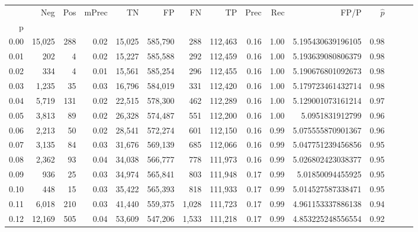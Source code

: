 \begin{tabular}{rrrrrrrrrrrrrrr}
\toprule
{} &     Neg &    Pos & mPrec &       TN &       FP &       FN &       TP &  Prec &   Rec &                  FP/P & $\hat{p}$ \\
p    &         &        &       &          &          &          &          &       &       &                       &           \\
\midrule
0.00 &  15,025 &    288 &  0.02 &   15,025 &  585,790 &      288 &  112,463 &  0.16 &  1.00 &     5.195430639196105 &      0.98 \\
0.01 &     202 &      4 &  0.02 &   15,227 &  585,588 &      292 &  112,459 &  0.16 &  1.00 &     5.193639080806379 &      0.98 \\
0.02 &     334 &      4 &  0.01 &   15,561 &  585,254 &      296 &  112,455 &  0.16 &  1.00 &     5.190676801092673 &      0.98 \\
0.03 &   1,235 &     35 &  0.03 &   16,796 &  584,019 &      331 &  112,420 &  0.16 &  1.00 &     5.179723461432714 &      0.98 \\
0.04 &   5,719 &    131 &  0.02 &   22,515 &  578,300 &      462 &  112,289 &  0.16 &  1.00 &     5.129001073161214 &      0.97 \\
0.05 &   3,813 &     89 &  0.02 &   26,328 &  574,487 &      551 &  112,200 &  0.16 &  1.00 &       5.0951831912799 &      0.96 \\
0.06 &   2,213 &     50 &  0.02 &   28,541 &  572,274 &      601 &  112,150 &  0.16 &  0.99 &     5.075555870901367 &      0.96 \\
0.07 &   3,135 &     84 &  0.03 &   31,676 &  569,139 &      685 &  112,066 &  0.16 &  0.99 &     5.047751239456856 &      0.95 \\
0.08 &   2,362 &     93 &  0.04 &   34,038 &  566,777 &      778 &  111,973 &  0.16 &  0.99 &     5.026802423038377 &      0.95 \\
0.09 &     936 &     25 &  0.03 &   34,974 &  565,841 &      803 &  111,948 &  0.17 &  0.99 &      5.01850094455925 &      0.95 \\
0.10 &     448 &     15 &  0.03 &   35,422 &  565,393 &      818 &  111,933 &  0.17 &  0.99 &     5.014527587338471 &      0.95 \\
0.11 &   6,018 &    210 &  0.03 &   41,440 &  559,375 &    1,028 &  111,723 &  0.17 &  0.99 &     4.961153337886138 &      0.94 \\
0.12 &  12,169 &    505 &  0.04 &   53,609 &  547,206 &    1,533 &  111,218 &  0.17 &  0.99 &     4.853225248556554 &      0.92 \\

\end{tabular}

